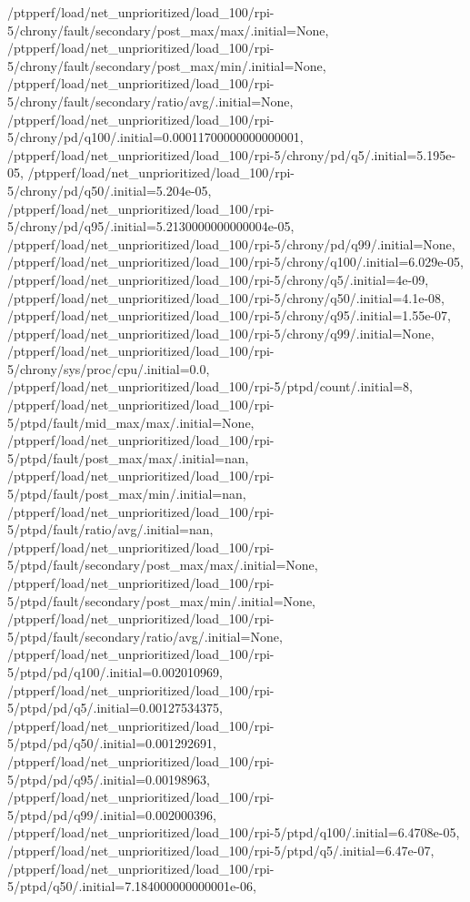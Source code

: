 {    /ptpperf/load/net_unprioritized/load_100/rpi-5/chrony/fault/secondary/post_max/max/.initial=None,
    /ptpperf/load/net_unprioritized/load_100/rpi-5/chrony/fault/secondary/post_max/min/.initial=None,
    /ptpperf/load/net_unprioritized/load_100/rpi-5/chrony/fault/secondary/ratio/avg/.initial=None,
    /ptpperf/load/net_unprioritized/load_100/rpi-5/chrony/pd/q100/.initial=0.00011700000000000001,
    /ptpperf/load/net_unprioritized/load_100/rpi-5/chrony/pd/q5/.initial=5.195e-05,
    /ptpperf/load/net_unprioritized/load_100/rpi-5/chrony/pd/q50/.initial=5.204e-05,
    /ptpperf/load/net_unprioritized/load_100/rpi-5/chrony/pd/q95/.initial=5.2130000000000004e-05,
    /ptpperf/load/net_unprioritized/load_100/rpi-5/chrony/pd/q99/.initial=None,
    /ptpperf/load/net_unprioritized/load_100/rpi-5/chrony/q100/.initial=6.029e-05,
    /ptpperf/load/net_unprioritized/load_100/rpi-5/chrony/q5/.initial=4e-09,
    /ptpperf/load/net_unprioritized/load_100/rpi-5/chrony/q50/.initial=4.1e-08,
    /ptpperf/load/net_unprioritized/load_100/rpi-5/chrony/q95/.initial=1.55e-07,
    /ptpperf/load/net_unprioritized/load_100/rpi-5/chrony/q99/.initial=None,
    /ptpperf/load/net_unprioritized/load_100/rpi-5/chrony/sys/proc/cpu/.initial=0.0,
    /ptpperf/load/net_unprioritized/load_100/rpi-5/ptpd/count/.initial=8,
    /ptpperf/load/net_unprioritized/load_100/rpi-5/ptpd/fault/mid_max/max/.initial=None,
    /ptpperf/load/net_unprioritized/load_100/rpi-5/ptpd/fault/post_max/max/.initial=nan,
    /ptpperf/load/net_unprioritized/load_100/rpi-5/ptpd/fault/post_max/min/.initial=nan,
    /ptpperf/load/net_unprioritized/load_100/rpi-5/ptpd/fault/ratio/avg/.initial=nan,
    /ptpperf/load/net_unprioritized/load_100/rpi-5/ptpd/fault/secondary/post_max/max/.initial=None,
    /ptpperf/load/net_unprioritized/load_100/rpi-5/ptpd/fault/secondary/post_max/min/.initial=None,
    /ptpperf/load/net_unprioritized/load_100/rpi-5/ptpd/fault/secondary/ratio/avg/.initial=None,
    /ptpperf/load/net_unprioritized/load_100/rpi-5/ptpd/pd/q100/.initial=0.002010969,
    /ptpperf/load/net_unprioritized/load_100/rpi-5/ptpd/pd/q5/.initial=0.00127534375,
    /ptpperf/load/net_unprioritized/load_100/rpi-5/ptpd/pd/q50/.initial=0.001292691,
    /ptpperf/load/net_unprioritized/load_100/rpi-5/ptpd/pd/q95/.initial=0.00198963,
    /ptpperf/load/net_unprioritized/load_100/rpi-5/ptpd/pd/q99/.initial=0.002000396,
    /ptpperf/load/net_unprioritized/load_100/rpi-5/ptpd/q100/.initial=6.4708e-05,
    /ptpperf/load/net_unprioritized/load_100/rpi-5/ptpd/q5/.initial=6.47e-07,
    /ptpperf/load/net_unprioritized/load_100/rpi-5/ptpd/q50/.initial=7.184000000000001e-06,
}
